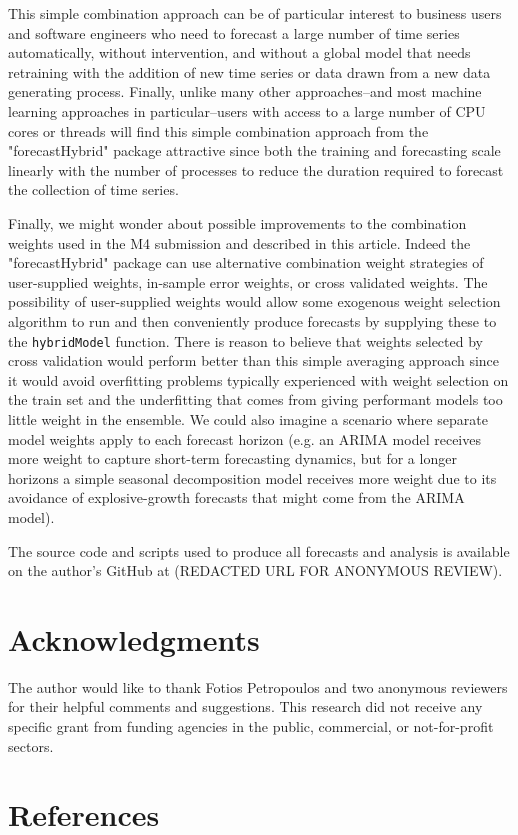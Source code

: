 \documentclass[11pt,3p,review,authoryear]{elsarticle}
\begin{document}
This simple combination approach can be of particular interest to business users and software engineers who need to forecast a large number of time series automatically, without intervention, and without a global model that needs retraining with the addition of new time series or data drawn from a new data generating process. Finally, unlike many other approaches--and most machine learning approaches in particular--users with access to a large number of CPU cores or threads will find this simple combination approach from the "forecastHybrid" package attractive since both the training and forecasting scale linearly with the number of processes to reduce the duration required to forecast the collection of time series.

Finally, we might wonder about possible improvements to the combination weights used in the M4 submission and described in this article. Indeed the "forecastHybrid" package can use alternative combination weight strategies of user-supplied weights, in-sample error weights, or cross validated weights. The possibility of user-supplied weights would allow some exogenous weight selection algorithm to run and then conveniently produce forecasts by supplying these to the \texttt{hybridModel} function. There is reason to believe that weights selected by cross validation would perform better than this simple averaging approach since it would avoid overfitting problems typically experienced with weight selection on the train set and the underfitting that comes from giving performant models too little weight in the ensemble. We could also imagine a scenario where separate model weights apply to each forecast horizon (e.g. an ARIMA model receives more weight to capture short-term forecasting dynamics, but for a longer horizons a simple seasonal decomposition model receives more weight due to its avoidance of explosive-growth forecasts that might come from the ARIMA model).

The source code and scripts used to produce all forecasts and analysis is available on the author's GitHub at (REDACTED URL FOR ANONYMOUS REVIEW).

\section*{Acknowledgments}

The author would like to thank Fotios Petropoulos and two anonymous reviewers for their helpful comments and suggestions. This research did not receive any specific grant from funding agencies in the public, commercial, or not-for-profit sectors.


\section{References}

\end{document}
